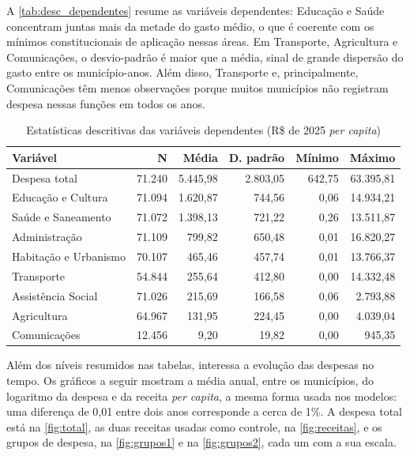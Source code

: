 A \autoref{tab:desc_dependentes} resume as variáveis dependentes: Educação e Saúde concentram juntas mais da metade do gasto médio, o que é coerente com os mínimos constitucionais de aplicação nessas áreas. Em Transporte, Agricultura e Comunicações, o desvio-padrão é maior que a média, sinal de grande dispersão do gasto entre os município-anos. Além disso, Transporte e, principalmente, Comunicações têm menos observações porque muitos municípios não registram despesa nessas funções em todos os anos.

\begin{table}[htbp]
\caption{Estatísticas descritivas das variáveis dependentes (R\$ de 2025 \textit{per capita})}\label{tab:desc_dependentes}
\footnotesize
\setlength{\tabcolsep}{4pt}
\begin{tabular}{lrrrrr}
\hline
\textbf{Variável} & \textbf{N} & \textbf{Média} & \textbf{D. padrão} & \textbf{Mínimo} & \textbf{Máximo} \\ \hline
Despesa total & 71.240 & 5.445,98 & 2.803,05 & 642,75 & 63.395,81 \\
Educação e Cultura & 71.094 & 1.620,87 & 744,56 & 0,06 & 14.934,21 \\
Saúde e Saneamento & 71.072 & 1.398,13 & 721,22 & 0,26 & 13.511,87 \\
Administração & 71.109 & 799,82 & 650,48 & 0,01 & 16.820,27 \\
Habitação e Urbanismo & 70.107 & 465,46 & 457,74 & 0,01 & 13.766,37 \\
Transporte & 54.844 & 255,64 & 412,80 & 0,00 & 14.332,48 \\
Assistência Social & 71.026 & 215,69 & 166,58 & 0,06 & 2.793,88 \\
Agricultura & 64.967 & 131,95 & 224,45 & 0,00 & 4.039,04 \\
Comunicações & 12.456 & 9,20 & 19,82 & 0,00 & 945,35 \\ \hline
\end{tabular}
\end{table}

Além dos níveis resumidos nas tabelas, interessa a evolução das despesas no tempo. Os gráficos a seguir mostram a média anual, entre os municípios, do logaritmo da despesa e da receita \textit{per capita}, a mesma forma usada nos modelos: uma diferença de 0,01 entre dois anos corresponde a cerca de 1\%. A despesa total está na \autoref{fig:total}, as duas receitas usadas como controle, na \autoref{fig:receitas}, e os grupos de despesa, na \autoref{fig:grupos1} e na \autoref{fig:grupos2}, cada um com a sua escala.

